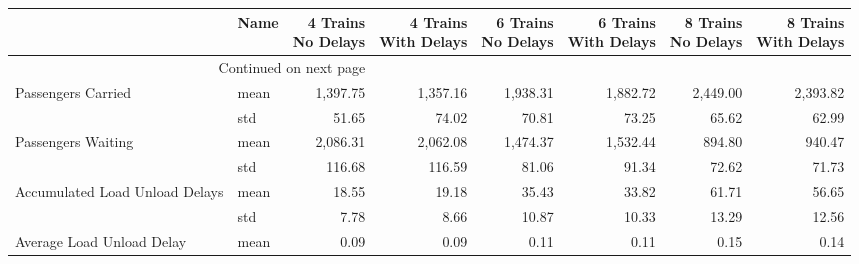 \begin{longtable}{llrrrrrr}
\toprule
                   & Name &  \thead{4 Trains \\ No Delays} &  \thead{4 Trains \\ With Delays} &  \thead{6 Trains \\ No Delays} &  \thead{6 Trains \\ With Delays} &  \thead{8 Trains \\ No Delays} &  \thead{8 Trains \\ With Delays} \\
\midrule
\endhead
\midrule
\multicolumn{3}{r}{{Continued on next page}} \\
\midrule
\endfoot

\bottomrule
\endlastfoot
Passengers Carried & mean &                       1,397.75 &                         1,357.16 &                       1,938.31 &                         1,882.72 &                       2,449.00 &                         2,393.82 \\
                   & std &                          51.65 &                            74.02 &                          70.81 &                            73.25 &                          65.62 &                            62.99 \\
Passengers Waiting & mean &                       2,086.31 &                         2,062.08 &                       1,474.37 &                         1,532.44 &                         894.80 &                           940.47 \\
                   & std &                         116.68 &                           116.59 &                          81.06 &                            91.34 &                          72.62 &                            71.73 \\
Accumulated Load Unload Delays & mean &                          18.55 &                            19.18 &                          35.43 &                            33.82 &                          61.71 &                            56.65 \\
                   & std &                           7.78 &                             8.66 &                          10.87 &                            10.33 &                          13.29 &                            12.56 \\
Average Load Unload Delay & mean &                           0.09 &                             0.09 &                           0.11 &                             0.11 &                           0.15 &                             0.14 \\

\end{longtable}
